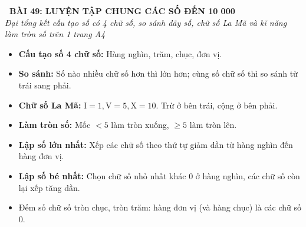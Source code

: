 \documentclass[11pt,a4paper]{article}
\begin{document}
\begin{tcolorbox}[
  enhanced,
  colback=white,
  colframe=primary,
  arc=3mm,
  boxrule=1.2pt,
  left=4mm, right=4mm, top=2.5mm, bottom=2.5mm,
  drop shadow=black!10!white
]
  \centering
  {\Large\bfseries\color{primary}\faBookmark\ BÀI 49: LUYỆN TẬP CHUNG CÁC SỐ ĐẾN 10 000}\\[1.5mm]
  {\small\itshape\color{black!75}Đại tổng kết cấu tạo số có 4 chữ số, so sánh dãy số, chữ số La Mã và kĩ năng làm tròn số trên 1 trang A4}
\end{tcolorbox}

\vspace{-2mm}


\noindent
\begin{minipage}[t]{0.49\textwidth}\vspace{0pt}
\begin{tcolorbox}[
  enhanced,
  colback=blue!4!white,
  colframe=blue!75!black,
  arc=2mm, boxrule=0.8pt,
  left=2mm, right=2mm, top=1.8mm, bottom=1.8mm,
  title={\footnotesize\bfseries\color{white}\faKey\ 1. Ma trận 4 kiến thức cốt lõi}
]
{\footnotesize
\begin{itemize}\setlength{\itemsep}{1.5pt}\setlength{\leftskip}{-2.5mm}
  \item \textbf{Cấu tạo số 4 chữ số:} Hàng nghìn, trăm, chục, đơn vị.
  \item \textbf{So sánh:} Số nào nhiều chữ số hơn thì lớn hơn; cùng số chữ số thì so sánh từ trái sang phải.
  \item \textbf{Chữ số La Mã:} $\text{I}=1, \text{V}=5, \text{X}=10$. Trừ ở bên trái, cộng ở bên phải.
  \item \textbf{Làm tròn số:} Mốc $< 5$ làm tròn xuống, $\ge 5$ làm tròn lên.
\end{itemize}
}
\end{tcolorbox}
\end{minipage}
\hfill
\begin{minipage}[t]{0.49\textwidth}\vspace{0pt}
\begin{tcolorbox}[
  enhanced,
  colback=teal!4!white,
  colframe=teal!75!black,
  arc=2mm, boxrule=0.8pt,
  left=2mm, right=2mm, top=1.8mm, bottom=1.8mm,
  title={\footnotesize\bfseries\color{white}\faSliders\ 2. Kĩ năng lập số từ chữ số cho trước}
]
{\footnotesize
\begin{itemize}\setlength{\itemsep}{1.5pt}\setlength{\leftskip}{-2.5mm}
  \item \textbf{Lập số lớn nhất:} Xếp các chữ số theo thứ tự giảm dần từ hàng nghìn đến hàng đơn vị.
  \item \textbf{Lập số bé nhất:} Chọn chữ số nhỏ nhất khác $0$ ở hàng nghìn, các chữ số còn lại xếp tăng dần.
  \item Đếm số chữ số tròn chục, tròn trăm: hàng đơn vị (và hàng chục) là các chữ số $0$.
\end{itemize}
}
\end{tcolorbox}
\end{minipage}
\end{document}
